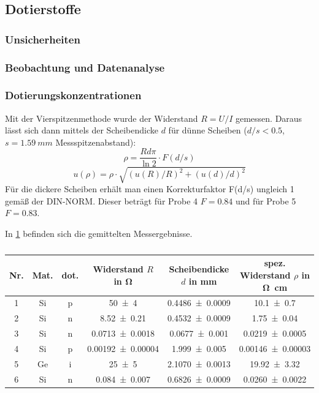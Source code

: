 \documentclass[
	a4paper,
	12pt,
	pagesize,
	ngerman
]{scrartcl}
\begin{document}
	\subsection{Dotierstoffe}
	\subsubsection{Unsicherheiten}
	\subsubsection{Beobachtung und Datenanalyse}

	\subsubsection*{Dotierungskonzentrationen} %
	Mit der Vierspitzenmethode wurde der Widerstand $R=U/I$ gemessen.
	Daraus lässt sich dann mittels der Scheibendicke $d$ für dünne Scheiben ($d/s<0.5$, $s=\SI{1.59}{mm}$ Messspitzenabstand):
	\begin{equation}
			\rho = \frac{R d \pi}{\ln 2} \cdot F(d/s)
	\end{equation}
	\begin{equation}
			u(\rho) = \rho\cdot\sqrt{(u(R)/R)^2 + (u(d)/d)^2}
	\end{equation}
	Für die dickere Scheiben erhält man einen Korrekturfaktor F(d/s) ungleich 1 gemäß der DIN-NORM. %
	Dieser beträgt für Probe 4 $F=0.84$ und für Probe 5 $F=0.83$.

	In \cref{tb_spez_wd} befinden sich die gemittelten Messergebnisse.

	\begin{table}[H]
		\centering
		\begin{tabular}{c | c | c | c | c | c  }
			 Nr.& Mat. & dot. & Widerstand $R$ in \si{\ohm}& Scheibendicke $d$ in \si{mm} & spez. Widerstand $\rho$ in \si{\ohm cm} \\ \hline %
			 1& Si& p& \SI{50+-4}{}&\SI{0.4486+-0.0009}{}& \SI{10.1+-0.7}{} \\
			 2& Si& n&\SI{8.52+-0.21}{}&\SI{0.4532+-0.0009}{}&\SI{1.75+-0.04}{} \\
			 3& Si& n&\SI{0.0713+-0.0018}{}&\SI{0.0677+-0.001}{}&\SI{0.0219+-0.0005}{} \\
			 4& Si& p&\SI{0.00192+-0.00004}{}&\SI{1.999+-0.005}{}&\SI{0.00146+-0.00003}{} \\ %
			 5& Ge& i&\SI{25+-5}{}&\SI{2.1070+-0.0013}{}&\SI{19.92+-3.32}{}  \\ %
			 6& Si& n&\SI{0.084+-0.007}{}&\SI{0.6826+-0.0009}{}&\SI{0.0260+-0.0022}{} \\
		\end{tabular}
		\caption{
		}
		\label{tb_spez_wd}
	\end{table}
\end{document}
